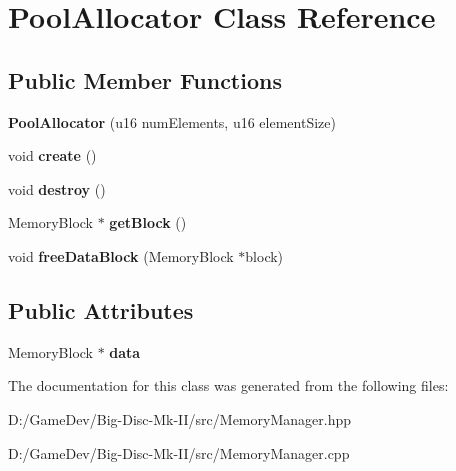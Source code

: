 \hypertarget{class_pool_allocator}{}\section{Pool\+Allocator Class Reference}
\label{class_pool_allocator}
\subsection*{Public Member Functions}
\begin{DoxyCompactItemize}
\item 
\mbox{\label{class_pool_allocator_a63694ab0370e83aaae09f127239c9b8f}} 
{\bfseries Pool\+Allocator} (u16 num\+Elements, u16 element\+Size)
\item 
\mbox{\label{class_pool_allocator_a297473188e77bd80f4d9e025f5d7bb6f}} 
void {\bfseries create} ()
\item 
\mbox{\label{class_pool_allocator_a5f885615f08fdc0ce4e468307fb99a46}} 
void {\bfseries destroy} ()
\item 
\mbox{\label{class_pool_allocator_a4f15f198bd531917698c3ce44d15ca44}} 
Memory\+Block $\ast$ {\bfseries get\+Block} ()
\item 
\mbox{\label{class_pool_allocator_a2c99d67869c9e7e2bf234db14d7a0861}} 
void {\bfseries free\+Data\+Block} (Memory\+Block $\ast$block)
\end{DoxyCompactItemize}
\subsection*{Public Attributes}
\begin{DoxyCompactItemize}
\item 
\mbox{\label{class_pool_allocator_a84c81d9fa882d62be860eff33aa96817}} 
Memory\+Block $\ast$ {\bfseries data}
\end{DoxyCompactItemize}


The documentation for this class was generated from the following files\+:\begin{DoxyCompactItemize}
\item 
D\+:/\+Game\+Dev/\+Big-\/\+Disc-\/\+Mk-\/\+I\+I/src/Memory\+Manager.\+hpp\item 
D\+:/\+Game\+Dev/\+Big-\/\+Disc-\/\+Mk-\/\+I\+I/src/Memory\+Manager.\+cpp\end{DoxyCompactItemize}
